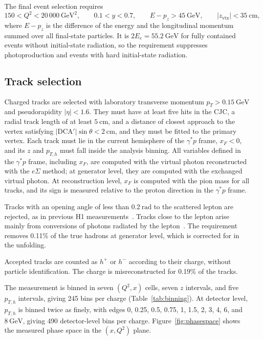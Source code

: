 \documentclass[11pt,a4paper]{article}
\newcommand{\Qsq}{Q^{2}}
\newcommand{\pTh}{p_{T,h}}
\newcommand{\hplus}{h^{+}}
\newcommand{\hminus}{h^{-}}
\newcommand{\GeV}{\mathrm{GeV}}
\newcommand{\GeVsq}{\mathrm{GeV}^{2}}
\begin{document}
The final event selection requires
\begin{equation}
  150<\Qsq<20\,000~\GeVsq, \qquad 0.1<y<0.7, \qquad E-p_{z}>45~\GeV, \qquad |z_{\mathrm{vtx}}|<35~\mathrm{cm},
\end{equation}
where $E-p_{z}$ is the difference of the energy and the longitudinal momentum summed over all final-state particles. It is $2E_{e}=55.2~\GeV$ for fully contained events without initial-state radiation, so the requirement suppresses photoproduction and events with hard initial-state radiation.

\subsection{Track selection}

Charged tracks are selected with laboratory transverse momentum $p_{T}>0.15~\GeV$ and pseudorapidity $|\eta|<1.6$. They must have at least five hits in the CJC, a radial track length of at least $5~\mathrm{cm}$, and a distance of closest approach to the vertex satisfying $|\mathrm{DCA}'|\sin\theta<2~\mathrm{cm}$, and they must be fitted to the primary vertex. Each track must lie in the current hemisphere of the $\gamma^{*}p$ frame, $x_{F}<0$, and its $z$ and $\pTh$ must fall inside the analysis binning. All variables defined in the $\gamma^{*}p$ frame, including $x_{F}$, are computed with the virtual photon reconstructed with the $e\Sigma$ method; at generator level, they are computed with the exchanged virtual photon. At reconstruction level, $x_{F}$ is computed with the pion mass for all tracks, and its sign is measured relative to the proton direction in the $\gamma^{*}p$ frame.

Tracks with an opening angle of less than $0.2~\mathrm{rad}$ to the scattered lepton are rejected, as in previous H1 measurements~\cite{H1:2013qsm,H1:2020zpd}. Tracks close to the lepton arise mainly from conversions of photons radiated by the lepton~\cite{Grebenyuk:2012thesis}. The requirement removes 0.11\% of the true hadrons at generator level, which is corrected for in the unfolding.

Accepted tracks are counted as $\hplus$ or $\hminus$ according to their charge, without particle identification. The charge is misreconstructed for 0.19\% of the tracks.

The measurement is binned in seven $(\Qsq,x)$ cells, seven $z$ intervals, and five $\pTh$ intervals, giving 245 bins per charge (Table~\ref{tab:binning}). At detector level, $\pTh$ is binned twice as finely, with edges $0$, 0.25, 0.5, 0.75, 1, 1.5, 2, 3, 4, 6, and $8~\GeV$, giving 490 detector-level bins per charge. Figure~\ref{fig:phasespace} shows the measured phase space in the $(x,\Qsq)$ plane.
\end{document}
